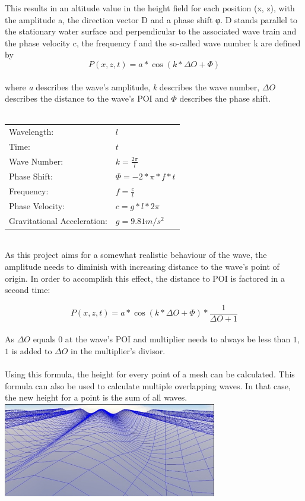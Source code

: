 ﻿\documentclass[12pt,a4paper]{scrartcl}
\begin{document}
This results in an altitude value in the height field for each position (x, z), with the amplitude a, the direction vector D and a phase shift φ. D stands parallel to the stationary water surface and perpendicular to the associated wave train and the phase velocity c, the frequency f and the so-called wave number k are defined by \\
$$P(x,z,t) = a * \cos(k * {\Delta}O + \Phi) $$
\ \\
where \textit{a} describes the wave's amplitude, \textit{k} describes the wave number, ${\Delta}O$ describes the distance to the wave's POI and $\Phi$ describes the phase shift.\\
\ \\
\begin{center}
	\begin{tabular}{ll}
		Wavelength: & $l$ \\
		Time: & $t$ \\
		Wave Number: & $k = \frac{2\pi}{l}$ \\
		Phase Shift: & $\Phi = -2 * \pi * f * t$ \\
		Frequency: & $f = \frac{c}{l}$ \\
		Phase Velocity: & $c = g * l * 2\pi$ \\
		Gravitational Acceleration: & $g = 9.81 m/s^2$
	\end{tabular}
\end{center}
\ \\
As this project aims for a somewhat realistic behaviour of the wave, the amplitude needs to diminish with increasing distance to the wave's point of origin. In order to accomplish this effect, the distance to POI is factored in a second time:

$$P(x,z,t) = a * \cos(k * {\Delta}O + \Phi) * \frac{1}{{\Delta}O+1} $$
\ \\
As ${\Delta}O$ equals $0$ at the wave's POI and multiplier needs to always be less than $1$, $1$ is added to ${\Delta}O$ in the multiplier's divisor.\\
\ \\
Using this formula, the height for every point of a mesh can be calculated. This formula can also be used to calculate multiple overlapping waves. In that case, the new height for a point is the sum of all waves.\\

\includegraphics[width=0.7\textwidth]{Images/SinWaves.jpg}
\end{document}
